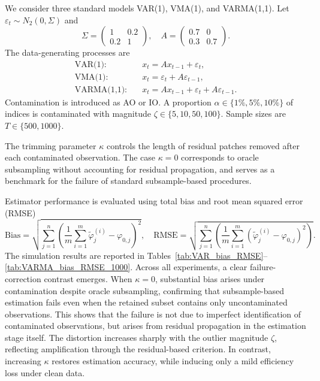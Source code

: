 \documentclass[12pt]{article}
\numberwithin{equation}{section}
\begin{document}
We consider three standard models VAR(1), VMA(1), and VARMA(1,1). 
Let $\varepsilon_t \sim N_2(0, \Sigma)$ and
\begin{equation}
\Sigma =
\begin{pmatrix}
1 & 0.2 \\
0.2 & 1
\end{pmatrix},
\quad
A =
\begin{pmatrix}
0.7 & 0 \\
0.3 & 0.7
\end{pmatrix}.
\end{equation}
The data-generating processes are
\begin{equation}
\begin{aligned}
\text{VAR(1):} \quad & x_t = A x_{t-1} + \varepsilon_t, \\
\text{VMA(1):} \quad & x_t = \varepsilon_t + A \varepsilon_{t-1}, \\
\text{VARMA(1,1):} \quad & x_t = A x_{t-1} + \varepsilon_t + A \varepsilon_{t-1}.
\end{aligned}
\end{equation}
Contamination is introduced as AO or IO. 
A proportion $\alpha \in \{1\%, 5\%, 10\%\}$ of indices is contaminated with magnitude $\zeta \in \{5, 10, 50, 100\}$. 
Sample sizes are $T \in \{500, 1000\}$.

The trimming parameter $\kappa$ controls the length of residual patches removed after each contaminated observation. 
The case $\kappa=0$ corresponds to oracle subsampling without accounting for residual propagation, and serves as a benchmark for the failure of standard subsample-based procedures. 

Estimator performance is evaluated using total bias and root mean squared error (RMSE)
\begin{equation}
\text{Bias} =
\sqrt{
\sum_{j=1}^n
\left(
\frac{1}{m} \sum_{i=1}^m \tilde{\varphi}_j^{(i)} - \varphi_{0,j}
\right)^2
}, \quad
\text{RMSE} =
\sqrt{
\sum_{j=1}^n
\left(
\frac{1}{m} \sum_{i=1}^m
\left(
\tilde{\varphi}_j^{(i)} - \varphi_{0,j}
\right)^2
\right)
}.
\end{equation}
The simulation results are reported in Tables~\ref{tab:VAR_bias_RMSE}--\ref{tab:VARMA_bias_RMSE_1000}. 
Across all experiments, a clear failure-correction contrast emerges. 
When $\kappa=0$, substantial bias arises under contamination despite oracle subsampling, confirming that subsample-based estimation fails even when the retained subset contains only uncontaminated observations. 
This shows that the failure is not due to imperfect identification of contaminated observations, but arises from residual propagation in the estimation stage itself. 
The distortion increases sharply with the outlier magnitude $\zeta$, reflecting amplification through the residual-based criterion. 
In contrast, increasing $\kappa$ restores estimation accuracy, while inducing only a mild efficiency loss under clean data.
\end{document}
